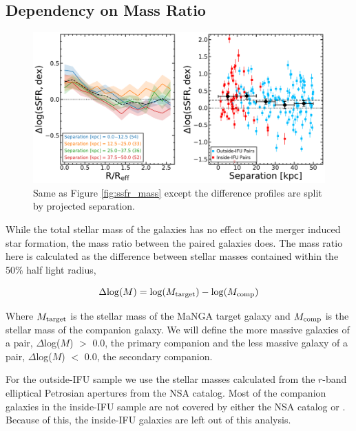 \documentclass[iop,revtex4,twocolumn,apj,numberedappendix,appendixfloats]{emulateapj}
\begin{document}
\subsection{Dependency on Mass Ratio}\label{sec:dm}

\begin{figure}
\centering
\includegraphics[width=\linewidth]{fig/ssfr_sep.pdf}
\caption[]{Same as Figure \ref{fig:ssfr_mass} except the difference profiles are split by projected separation. }
\label{fig:ssfr_sep}
\end{figure}

While the total stellar mass of the galaxies has no effect on the merger induced star formation, the mass ratio between the paired galaxies does. The mass ratio here is calculated as the difference between stellar masses contained within the 50\% half light radius, 

\begin{equation}
\Delta {\rm log}(M) = {\rm log}(M_{\rm target}) - {\rm log}(M_{\rm comp}) 
\end{equation}

Where $M_{\rm target}$ is the stellar mass of the MaNGA target galaxy and $M_{\rm comp}$ is the stellar mass of the companion galaxy. We will define the more massive galaxies of a pair, $\Delta$log($M$) $>$ 0.0, the primary companion and the less massive galaxy of a pair, $\Delta$log($M$) $<$ 0.0, the secondary companion.

For the outside-IFU sample we use the stellar masses calculated from the $r$-band elliptical Petrosian apertures from the NSA catalog. Most of the companion galaxies in the inside-IFU sample are not covered by either the NSA catalog or \citet{Simard:2011}. Because of this, the inside-IFU galaxies are left out of this analysis.
\end{document}
